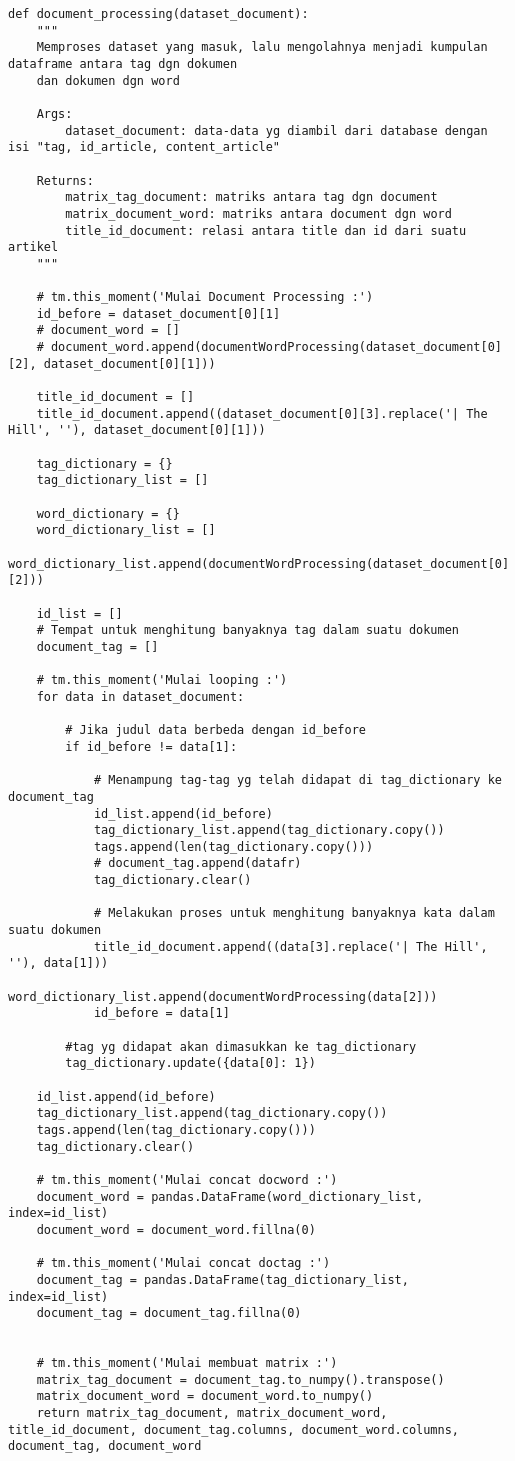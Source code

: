 \begin{lstlisting}[breaklines=true]
def document_processing(dataset_document):
	"""
	Memproses dataset yang masuk, lalu mengolahnya menjadi kumpulan dataframe antara tag dgn dokumen
	dan dokumen dgn word

	Args:
		dataset_document: data-data yg diambil dari database dengan isi "tag, id_article, content_article"
		
	Returns:
		matrix_tag_document: matriks antara tag dgn document
		matrix_document_word: matriks antara document dgn word
		title_id_document: relasi antara title dan id dari suatu artikel
	"""
	
	# tm.this_moment('Mulai Document Processing :')
	id_before = dataset_document[0][1]
	# document_word = []
	# document_word.append(documentWordProcessing(dataset_document[0][2], dataset_document[0][1]))
	
	title_id_document = []
	title_id_document.append((dataset_document[0][3].replace('| The Hill', ''), dataset_document[0][1]))
	
	tag_dictionary = {}
	tag_dictionary_list = []
	
	word_dictionary = {}
	word_dictionary_list = []
	word_dictionary_list.append(documentWordProcessing(dataset_document[0][2]))
	
	id_list = []
	# Tempat untuk menghitung banyaknya tag dalam suatu dokumen
	document_tag = []
	
	# tm.this_moment('Mulai looping :')
	for data in dataset_document:
		
		# Jika judul data berbeda dengan id_before
		if id_before != data[1]:
			
			# Menampung tag-tag yg telah didapat di tag_dictionary ke document_tag
			id_list.append(id_before)
			tag_dictionary_list.append(tag_dictionary.copy())
			tags.append(len(tag_dictionary.copy()))
			# document_tag.append(datafr)
			tag_dictionary.clear()
			
			# Melakukan proses untuk menghitung banyaknya kata dalam suatu dokumen
			title_id_document.append((data[3].replace('| The Hill', ''), data[1]))
			word_dictionary_list.append(documentWordProcessing(data[2]))
			id_before = data[1]
		
		#tag yg didapat akan dimasukkan ke tag_dictionary
		tag_dictionary.update({data[0]: 1})

	id_list.append(id_before)
	tag_dictionary_list.append(tag_dictionary.copy())
	tags.append(len(tag_dictionary.copy()))
	tag_dictionary.clear()
	
	# tm.this_moment('Mulai concat docword :')
	document_word = pandas.DataFrame(word_dictionary_list, index=id_list)
	document_word = document_word.fillna(0)
	
	# tm.this_moment('Mulai concat doctag :')
	document_tag = pandas.DataFrame(tag_dictionary_list, index=id_list)
	document_tag = document_tag.fillna(0)

	
	# tm.this_moment('Mulai membuat matrix :')
	matrix_tag_document = document_tag.to_numpy().transpose()
	matrix_document_word = document_word.to_numpy()
	return matrix_tag_document, matrix_document_word, title_id_document, document_tag.columns, document_word.columns, document_tag, document_word

\end{lstlisting}

